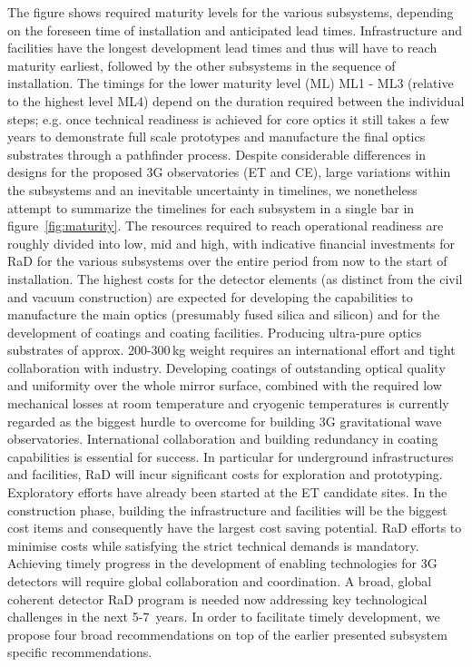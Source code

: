 The figure shows required maturity levels for the various subsystems, depending on the foreseen time of installation and anticipated lead times. Infrastructure and facilities have the longest development lead times and thus will have to reach maturity earliest, followed by the other subsystems in the sequence of installation. The timings for the lower maturity level (ML) ML1 - ML3 (relative to the highest level ML4) depend on the duration required between the individual steps; e.g. once technical readiness is achieved for core optics it still takes a few years to demonstrate full scale prototypes and manufacture the final optics substrates through a pathfinder process. Despite considerable differences in designs for the proposed \ac{3G} observatories (\acs{ET} and \acs{CE}), large variations within the subsystems and an inevitable uncertainty in timelines, we nonetheless attempt to summarize the timelines for each subsystem in a single bar in figure~\ref{fig:maturity}. The resources required to reach operational readiness are roughly divided into low, mid and high, with indicative financial investments for \ac{RaD} for the various subsystems over the entire period from now to the start of installation. 
The highest costs for the detector elements (as distinct from the civil and vacuum construction) are expected for developing the capabilities to manufacture the main optics (presumably fused silica and silicon) and for the development of coatings and coating facilities. Producing ultra-pure optics substrates of approx. 200-300\,kg weight requires an international effort and tight collaboration with industry. Developing coatings of outstanding optical quality and uniformity over the whole mirror surface, combined with the required low mechanical losses at room temperature and cryogenic temperatures is currently regarded as the biggest hurdle to overcome for building \ac{3G} gravitational wave observatories. International collaboration and building redundancy in coating capabilities is essential for success. 
In particular for underground infrastructures and facilities, \ac{RaD} will incur significant costs for exploration and prototyping. Exploratory efforts have already been started at the \ac{ET} candidate sites. In the construction phase, building the infrastructure and facilities will be the biggest cost items and consequently have the largest cost saving potential. \ac{RaD} efforts to minimise costs while satisfying the strict technical demands is mandatory. 
Achieving timely progress in the development of enabling technologies for \ac{3G} detectors will require global collaboration and coordination. A broad, global coherent detector \ac{RaD} program is needed now addressing key technological challenges in the next 5-7~years. In order to facilitate timely development, we propose four broad recommendations on top of the earlier presented subsystem specific recommendations. 
